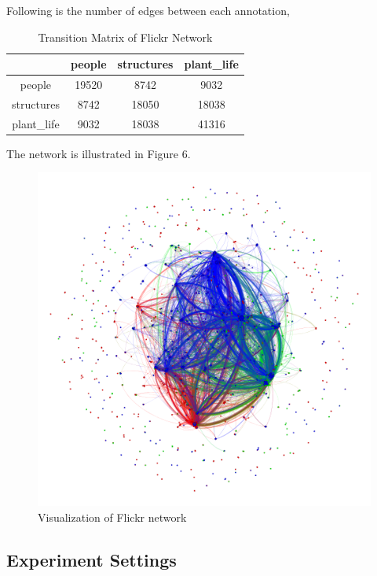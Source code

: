 Following is the number of edges between each annotation,
\begin{table}[!ht]
\centering
\begin{tabular}{c|c|c|c}
\toprule
& people & structures & plant\_life\\
\midrule
people & 19520 & 8742 & 9032\\
structures & 8742 & 18050 & 18038\\
plant\_life & 9032 & 18038 & 41316\\
\bottomrule
\end{tabular}
\caption{Transition Matrix of Flickr Network}
\end{table}

The network is illustrated in Figure 6.

\begin{figure}[!ht]
	\centering
	\begin{minipage}[b]{0.5\linewidth}
	\centering
	\includegraphics[width=\textwidth]{FIG/flickr.png}
	\caption{Visualization of Flickr network}
	\label{fig:figure1}
	\end{minipage}
\end{figure}	

\subsection{Experiment Settings}

